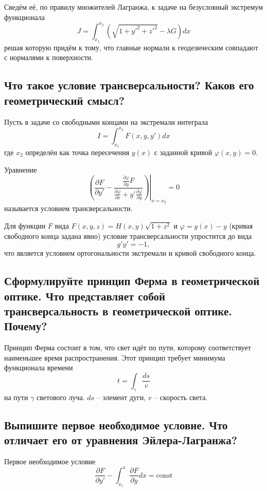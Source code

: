 \documentclass{article}
\newcommand{\Lg}{Лагранжа}
\begin{document}
Сведём её, по правилу множителей \Lg, к задаче на безусловный экстремум функционала
\[ J=\int_{x_1}^{x_2} \left(\sqrt{1+y'^2+z'^2}-\lambda G \right)dx \]
решая которую придём к тому, что главные нормали к геодезическим совпадают с нормалями к поверхности.

\subsection{Что такое условие трансверсальности? Каков его геометрический смысл?}

Пусть в задаче со свободными концами на экстремали интеграла
\[ I=\int_{x_1}^{x_2} F(x, y, y')dx \]
где $ x_2 $ определён как точка пересечения $ y(x) $ с заданной кривой $ \varphi(x, y)=0 $.

Уравнение %
\[ \left. \left( \frac{\partial F}{\partial y'}-\frac{\frac{\partial \varphi}{\partial y}F}{\frac{\partial \varphi}{\partial x}+y'\frac{\partial \varphi}{\partial y}} \right) \right|_{x=x_2}=0 \] %
называется условием трансверсальности. 

Для функции $F$ вида $ F(x,y,z)=H(x,y)\sqrt{1+z^2} $ и $\varphi = g(x)-y$ (кривая свободного конца задана явно) 
условие трансверсальности упростится до вида 
\[ g'y'=-1, \]
что является условием ортогональности экстремали и кривой свободного конца.

\subsection{Сформулируйте принцип Ферма в геометрической оптике. Что представляет собой трансверсальность в геометрической оптике. Почему?}
Принцип Ферма состоит в том, что свет идёт по пути, которому соответствует наименьшее время распространения. 
Этот принцип требует минимума функционала времени 
\[ t=\int_{\gamma} \frac{ds}{v} \]  
на пути $\gamma$ светового луча. $ds$ -- элемент дуги, $v$ -- скорость света.


\subsection{Выпишите первое необходимое условие. Что отличает его от уравнения Эйлера-Лагранжа?}
Первое необходимое условие
 \[ \frac{\partial F}{\partial y'} - \int_{x_1}^{x}\frac{\partial F}{\partial y}dx = \text{const}\]
\end{document}
